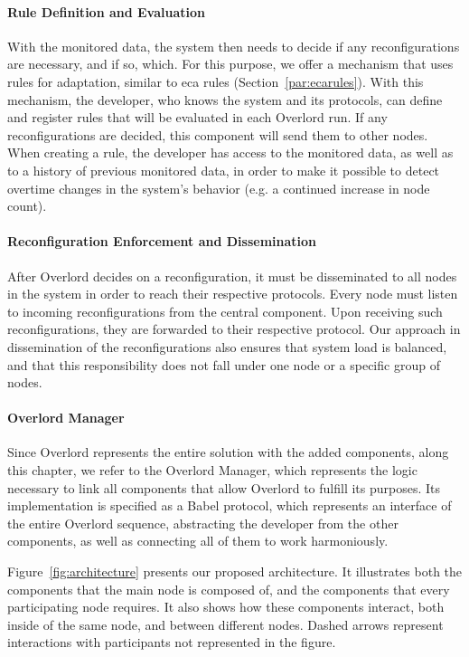 \paragraph{Rule Definition and Evaluation} With the monitored data, the system then needs to decide if any reconfigurations are necessary, and if so, which. For this purpose, we offer a mechanism that uses rules for adaptation, similar to \gls{eca} rules (Section~\ref{par:ecarules}). With this mechanism, the developer, who knows the system and its protocols, can define and register rules that will be evaluated in each Overlord run. If any reconfigurations are decided, this component will send them to other nodes. When creating a rule, the developer has access to the monitored data, as well as to a history of previous monitored data, in order to make it possible to detect overtime changes in the system's behavior (e.g. a continued increase in node count).

\paragraph{Reconfiguration Enforcement and Dissemination} After Overlord decides on a reconfiguration, it must be disseminated to all nodes in the system in order to reach their respective protocols. Every node must listen to incoming reconfigurations from the central component. Upon receiving such reconfigurations, they are forwarded to their respective protocol. Our approach in dissemination of the reconfigurations also ensures that system load is balanced, and that this responsibility does not fall under one node or a specific group of nodes.

\paragraph{Overlord Manager} Since Overlord represents the entire solution with the added components, along this chapter, we refer to the Overlord Manager, which represents the logic necessary to link all components that allow Overlord to fulfill its purposes. Its implementation is specified as a Babel protocol, which represents an interface of the entire Overlord sequence, abstracting the developer from the other components, as well as connecting all of them to work harmoniously.

Figure~\ref{fig:architecture} presents our proposed architecture. It illustrates both the components that the main node is composed of, and the components that every participating node requires. It also shows how these components interact, both inside of the same node, and between different nodes. Dashed arrows represent interactions with participants not represented in the figure.

